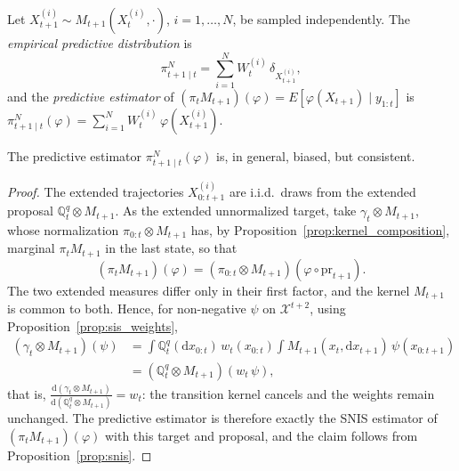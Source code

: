 \begin{definition}
    \label{def:predictive_estimator}
    Let $X_{t+1}^{(i)}\sim M_{t+1}(X_t^{(i)},\cdot)$, $i=1,\ldots,N$, be sampled independently. The \emph{empirical predictive distribution} is
    \begin{equation}
        \pi_{t+1\mid t}^N = \sum_{i=1}^{N}W_t^{(i)}\,\delta_{X_{t+1}^{(i)}},
        \label{eq:empirical_predictive_distribution}
    \end{equation}
    and the \emph{predictive estimator} of $(\pi_tM_{t+1})(\varphi) = E[\varphi(X_{t+1})\mid y_{1:t}]$ is $\pi_{t+1\mid t}^N(\varphi) = \sum_{i=1}^{N}W_t^{(i)}\,\varphi(X_{t+1}^{(i)})$.
\end{definition}

\begin{proposition}
    \label{prop:predictive_estimator}
    The predictive estimator $\pi_{t+1\mid t}^N(\varphi)$ is, in general, biased, but consistent.
\end{proposition}
\begin{proof}
    The extended trajectories $X_{0:t+1}^{(i)}$ are i.i.d.\ draws from the extended proposal $\mathbb{Q}^q_t\otimes M_{t+1}$. As the extended unnormalized target, take $\gamma_t\otimes M_{t+1}$, whose normalization $\pi_{0:t}\otimes M_{t+1}$ has, by Proposition~\ref{prop:kernel_composition}, marginal $\pi_tM_{t+1}$ in the last state, so that
    \begin{equation}
        (\pi_tM_{t+1})(\varphi) = (\pi_{0:t}\otimes M_{t+1})(\varphi\circ\mathrm{pr}_{t+1}).
    \end{equation}
    The two extended measures differ only in their first factor, and the kernel $M_{t+1}$ is common to both. Hence, for non-negative $\psi$ on $\mathcal{X}^{t+2}$, using Proposition~\ref{prop:sis_weights},
    \begin{align}
        (\gamma_t\otimes M_{t+1})(\psi) &= \int\mathbb{Q}^q_t(\mathrm{d}x_{0:t})\,w_t(x_{0:t})\int M_{t+1}(x_t,\mathrm{d}x_{t+1})\,\psi(x_{0:t+1}) \\
        &= (\mathbb{Q}^q_t\otimes M_{t+1})(w_t\,\psi),
    \end{align}
    that is, $\frac{\mathrm{d}(\gamma_t\otimes M_{t+1})}{\mathrm{d}(\mathbb{Q}^q_t\otimes M_{t+1})} = w_t$: the transition kernel cancels and the weights remain unchanged. The predictive estimator is therefore exactly the SNIS estimator of $(\pi_tM_{t+1})(\varphi)$ with this target and proposal, and the claim follows from Proposition~\ref{prop:snis}.
\end{proof}

